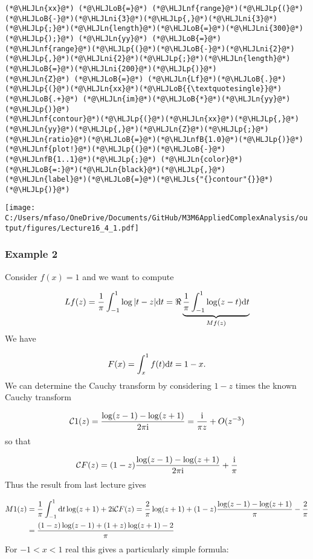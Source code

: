 \documentclass[12pt,a4paper]{article}
\newcommand{\HLJLn}[1]{#1}
\newcommand{\HLJLnf}[1]{\textcolor[RGB]{66,102,213}{#1}}
\newcommand{\HLJLs}[1]{\textcolor[RGB]{201,61,57}{#1}}
\newcommand{\HLJLnfB}[1]{\textcolor[RGB]{59,151,46}{#1}}
\newcommand{\HLJLni}[1]{\textcolor[RGB]{59,151,46}{#1}}
\newcommand{\HLJLoB}[1]{\textcolor[RGB]{102,102,102}{\textbf{#1}}}
\newcommand{\HLJLp}[1]{#1}
\def\D{ {\rm d} }
\def\I{ {\rm i} }
\def\CC{ {\cal C} }
\begin{document}
\begin{lstlisting}
(*@\HLJLn{xx}@*) (*@\HLJLoB{=}@*) (*@\HLJLnf{range}@*)(*@\HLJLp{(}@*)(*@\HLJLoB{-}@*)(*@\HLJLni{3}@*)(*@\HLJLp{,}@*)(*@\HLJLni{3}@*)(*@\HLJLp{;}@*)(*@\HLJLn{length}@*)(*@\HLJLoB{=}@*)(*@\HLJLni{300}@*)(*@\HLJLp{);}@*) (*@\HLJLn{yy}@*) (*@\HLJLoB{=}@*) (*@\HLJLnf{range}@*)(*@\HLJLp{(}@*)(*@\HLJLoB{-}@*)(*@\HLJLni{2}@*)(*@\HLJLp{,}@*)(*@\HLJLni{2}@*)(*@\HLJLp{;}@*)(*@\HLJLn{length}@*)(*@\HLJLoB{=}@*)(*@\HLJLni{200}@*)(*@\HLJLp{)}@*)
(*@\HLJLn{Z}@*) (*@\HLJLoB{=}@*) (*@\HLJLn{Lf}@*)(*@\HLJLoB{.}@*)(*@\HLJLp{(}@*)(*@\HLJLn{xx}@*)(*@\HLJLoB{{\textquotesingle}}@*) (*@\HLJLoB{.+}@*) (*@\HLJLn{im}@*)(*@\HLJLoB{*}@*)(*@\HLJLn{yy}@*)(*@\HLJLp{)}@*)
(*@\HLJLnf{contour}@*)(*@\HLJLp{(}@*)(*@\HLJLn{xx}@*)(*@\HLJLp{,}@*)(*@\HLJLn{yy}@*)(*@\HLJLp{,}@*)(*@\HLJLn{Z}@*)(*@\HLJLp{;}@*)(*@\HLJLn{ratio}@*)(*@\HLJLoB{=}@*)(*@\HLJLnfB{1.0}@*)(*@\HLJLp{)}@*)
(*@\HLJLnf{plot!}@*)(*@\HLJLp{(}@*)(*@\HLJLoB{-}@*)(*@\HLJLnfB{1..1}@*)(*@\HLJLp{;}@*) (*@\HLJLn{color}@*)(*@\HLJLoB{=:}@*)(*@\HLJLn{black}@*)(*@\HLJLp{,}@*) (*@\HLJLn{label}@*)(*@\HLJLoB{=}@*)(*@\HLJLs{"{}contour"{}}@*)(*@\HLJLp{)}@*)
\end{lstlisting}

\texttt{[image: C:/Users/mfaso/OneDrive/Documents/GitHub/M3M6AppliedComplexAnalysis/output/figures/Lecture16\_4\_1.pdf]}

\subsubsection{Example 2}
Consider $f(x) = 1$ and we want to compute

\[
L f(z) = {1 \over \pi} \int_{-1}^1 \log|t-z| \D t = \Re \underbrace{{1 \over \pi} \int_{-1}^1 \log(z-t) \D t }_{M f(z)}
\]
We have

\[
F(x) = \int_x^1 f(t) \D t = 1-x.
\]
We can determine the Cauchy transform by considering $1-z$ times the known Cauchy transform

\[
\CC 1(z) = {\log(z-1) - \log(z+1) \over 2 \pi \I} = {\I  \over  \pi z} + O(z^{-3})
\]
so that

\[
\CC F(z) =  (1-z) {\log(z-1) - \log(z+1) \over 2 \pi \I} + {\I \over \pi}
\]
Thus the result from last lecture gives


\begin{align*}
M 1(z) &= {1 \over \pi} \int_{-1}^1  \D t \log(z+1)+ 2 \I \CC F(z) = {2 \over \pi} \log(z+1) +
(1-z) {\log(z-1) - \log(z+1) \over \pi} - {2 \over \pi} \\
&= {(1-z) \log(z-1) + (1+z) \log(z+1) -2 \over \pi}
\end{align*}
For $-1 < x < 1$ real this gives a particularly simple formula:
\end{document}
